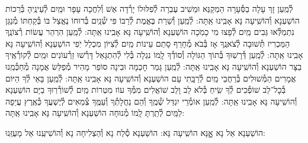 \documentclass[twoside, openany, parskip=half, 11pt]{book}
\begin{document}
\begin{small}
לְ֯מַֽעַן זָךְ עָלָה בַסְּ֯עָרָה הַמְקַנֵּא וּמֵשִׁיב עֶבְרָה
לְ֯פִלּוּלוֹ יָרְ֯דָה אֵשׁ וְ֯לִחֲכָה עָפָר וּמַֽיִם לְ֯עֵינֶֽיהָ בְּ֯רֵכוֹת הוֹשַׁעְנָא וְ֯הוֹשִֽׁיעָה נָּא אָבִֽינוּ אַֽתָּה:
לְ֯מַֽעַן וְ֯שֵׁרֵת בֶּאֱמֶת לְ֯רַבּוֹ פִּי שְׁ֯נַֽיִם בְּ֯רוּחוֹ נֶאֱצַל בּוֹ
בְּ֯קַחְתּוֹ מְ֯נַגֵּן נִתְמַלְּ֯אוּ גֵּבִים מַֽיִם לְ֯פָצוּ מִי כָמֹֽכָה הוֹשַׁעְנָא וְ֯הוֹשִֽׁיעָה נָּא אָבִֽינוּ אַֽתָּה:
לְ֯מַֽעַן הִרְהֵר עֲשׂוֹת רְ֯צוֹנֶֽךָ הַמַּכְרִיז תְּ֯שׁוּבָה לְ֯צֹאנֶֽךָ
אָז בְּ֯בֹא מְ֯חָרֵף סָתַם עֵינוֹת מַֽיִם לְ֯צִיּוֹן מִכְלַל יֹֽפִי הוֹשַׁעְנָא וְ֯הוֹשִֽׁיעָה נָּא אָבִֽינוּ אַֽתָּה:
לְ֯מַֽעַן דְּ֯רָשֽׁוּךָ בְּ֯תוֹךְ הַגּוֹלָה וְ֯סוֹדְ֯ךָ לָֽמוֹ נִגְלָה
בְּ֯לִי לְ֯הִתְגָּאֵל דָּרְ֯שׁוּ זֵרְ֯עוֹנִים וּמַֽיִם לְ֯קוֹרְ֯אֶֽיךָ בַצָּר הוֹשַׁעְנָא וְ֯הוֹשִֽׁיעָה נָּא אָבִֽינוּ אַֽתָּה:
לְ֯מַֽעַן גָּמַר חׇכְמָה וּבִינָה סוֹפֵר מָהִיר מְ֯פַלֵּשׂ אֲמָנָה
מְ֯חַכְּ֯מֵֽנוּ אֲמָרִים הַמְּ֯שׁוּלִים בְּ֯רַחֲבֵי מַֽיִם לְ֯רַבָּֽתִי עָם הוֹשַׁעְנָא וְ֯הוֹשִֽׁיעָה נָּא אָבִֽינוּ אַֽתָּה:
לְ֯מַֽעַן בָּאֵי לְ֯ךָ הַיּוֹם בְּ֯כׇל־לֵב שׁוֹפְ֯כִים לְ֯ךָ שִֽׂיחַ בְּ֯לֹא לֵב וָלֵב
שׁוֹאֲלִים מִמְּ֯ךָ עוֹז מִטְרוֹת מַֽיִם לְ֯שׁוֹרְ֯רֽוּךָ בַיָּם הוֹשַׁעְנָא וְ֯הוֹשִֽׁיעָה נָּא אָבִֽינוּ אַֽתָּה:
לְ֯מַֽעַן אוֹמְ֯רֵי יִגְדַּל שְׁ֯מֶֽךָ וְ֯הֵם נַחֲלָתְ֯ךָ וְ֯עַמֶּֽךָ
צְ֯מֵאִים לְ֯יֶשְׁעֲךָ כְּ֯אֶֽרֶץ עֲיֵפָה לַמַּֽיִם לְ֯תַֽרְתָּ לָֽמוֹ מְ֯נוּחָה הוֹשַׁעְנָא וְ֯הוֹשִֽׁיעָה נָּא אָבִֽינוּ אַֽתָּה:

\end{small}

\begin{large}
\shatzvkahal
הוֹשַׁעְנָא אֵל נָא אׇׇׇנָּא הוֹשִֽׁיעָה נָּא:
הוֹשַׁעְנָא סְ֯לַח נָא וְ֯הַצְלִיחָה נָא וְ֯הוֹשִׁיעֵֽנוּ אֵל מָעֻזֵּֽנוּ:

\end{large}
\end{document}
